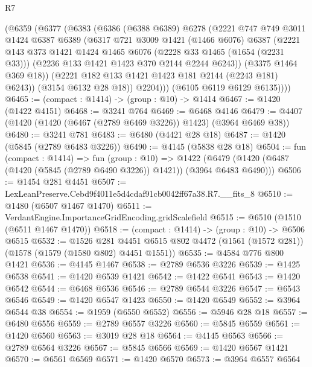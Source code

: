 \begin{lexlean}{R7}
\begin{coremodule}
          (@6359
            (@6377
              (@6383
                (@6386
                  (@6388 @6389)
                  @6278
                  (@2221
                    @747
                    @749
                    @3011
                    @1424
                    @6387
                    @6389
                    (@6317
                      @721
                      @3009
                      @1421
                      (@1466 @6076)
                      @6387
                      (@2221
                        @143
                        @373
                        @1421
                        @1424
                        @1465
                        @6076
                        (@2228 @33 @1465 (@1654 (@2231 @33)))
                        (@2236 @133 @1421 @1423 @370 @2144 @2244 @6243))
                      (@3375 @1464 @369 @18))
                    (@2221 @182 @133 @1421 @1423 @181 @2144 (@2243 @181) @6243))
                  (@3154 @6132 @28 @18))
                @2204)))
          (@6105 @6119 @6129 @6135))))
@6465 := (compact : @1414) -> (group : @10) -> @1414
@6467 := @1420 (@1422 @4151)
@6468 := @3241 @764
@6469 := @6468 @4146
@6479 := @4407 (@1420 (@1420 (@6467 (@2789 @6469 @3226)) @1423) (@3964 @6469 @38))
@6480 := @3241 @781
@6483 := @6480 (@4421 @28 @18)
@6487 := @1420 (@5845 (@2789 @6483 @3226))
@6490 := @4145 (@5838 @28 @18)
@6504 := fun (compact : @1414) =>
  fun (group : @10) =>
  @1422 (@6479 (@1420 (@6487 (@1420 (@5845 (@2789 @6490 @3226)) @1421)) (@3964 @6483 @6490)))
@6506 := @1454 @281 @4451
@6507 := LexLeanPreserve.Cebd9f4011e5d4cdaf91cb0042ff67a38.R7.__fits_8
@6510 := @1480 (@6507 @1467 @1470)
@6511 := VerdantEngine.ImportanceGridEncoding.gridScalefield
@6515 := @6510 (@1510 (@6511 @1467 @1470))
@6518 := (compact : @1414) -> (group : @10) -> @6506 @6515
@6532 := @1526
    @281
    @4451
    @6515
    @802
    @4472
    (@1561 (@1572 @281))
    (@1578 (@1579 (@1580 @802) @4451 @1551))
@6535 := @4584 @776 @800 @1421
@6536 := @4145 @1467
@6538 := @2789 @6536 @3226
@6539 := @1425 @6538
@6541 := @1420 @6539 @1421
@6542 := @1422 @6541
@6543 := @1420 @6542
@6544 := @6468 @6536
@6546 := @2789 @6544 @3226
@6547 := @6543 @6546
@6549 := @1420 @6547 @1423
@6550 := @1420 @6549
@6552 := @3964 @6544 @38
@6554 := @1959 (@6550 @6552)
@6556 := @5946 @28 @18
@6557 := @6480 @6556
@6559 := @2789 @6557 @3226
@6560 := @5845 @6559
@6561 := @1420 @6560
@6563 := @3019 @28 @18
@6564 := @4145 @6563
@6566 := @2789 @6564 @3226
@6567 := @5845 @6566
@6569 := @1420 @6567 @1421
@6570 := @6561 @6569
@6571 := @1420 @6570
@6573 := @3964 @6557 @6564

\end{coremodule}
\end{lexlean}
